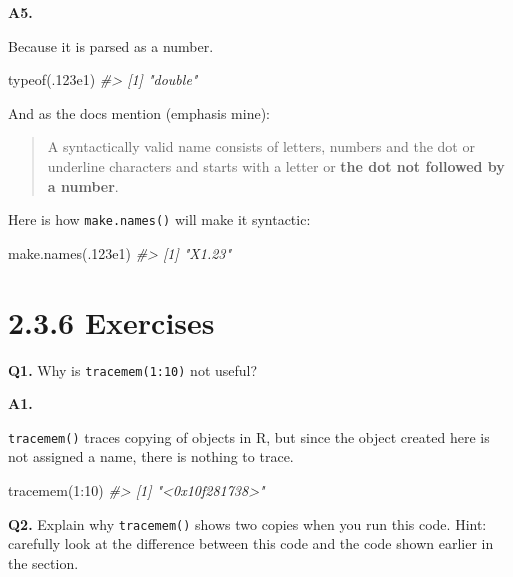 \documentclass[
]{book}
\newenvironment{Shaded}{\begin{snugshade}}{\end{snugshade}}
\newcommand{\CommentTok}[1]{\textcolor[rgb]{0.56,0.35,0.01}{\textit{#1}}}
\newcommand{\DecValTok}[1]{\textcolor[rgb]{0.00,0.00,0.81}{#1}}
\newcommand{\FloatTok}[1]{\textcolor[rgb]{0.00,0.00,0.81}{#1}}
\newcommand{\FunctionTok}[1]{\textcolor[rgb]{0.00,0.00,0.00}{#1}}
\newcommand{\NormalTok}[1]{#1}
\newcommand{\SpecialCharTok}[1]{\textcolor[rgb]{0.00,0.00,0.00}{#1}}
\begin{document}
\textbf{A5.}

Because it is parsed as a number.

\begin{Shaded}
\begin{Highlighting}[]
\FunctionTok{typeof}\NormalTok{(.}\FloatTok{123e1}\NormalTok{)}
\CommentTok{\#\textgreater{} [1] "double"}
\end{Highlighting}
\end{Shaded}

And as the docs mention (emphasis mine):

\begin{quote}
A syntactically valid name consists of letters, numbers and the dot or underline characters and starts with a letter or \textbf{the dot not followed by a number}.
\end{quote}

Here is how \texttt{make.names()} will make it syntactic:

\begin{Shaded}
\begin{Highlighting}[]
\FunctionTok{make.names}\NormalTok{(.}\FloatTok{123e1}\NormalTok{)}
\CommentTok{\#\textgreater{} [1] "X1.23"}
\end{Highlighting}
\end{Shaded}

\hypertarget{exercises-1}{%
\section{2.3.6 Exercises}\label{exercises-1}}

\textbf{Q1.} Why is \texttt{tracemem(1:10)} not useful?

\textbf{A1.}

\texttt{tracemem()} traces copying of objects in R, but since the object created here is not assigned a name, there is nothing to trace.

\begin{Shaded}
\begin{Highlighting}[]
\FunctionTok{tracemem}\NormalTok{(}\DecValTok{1}\SpecialCharTok{:}\DecValTok{10}\NormalTok{)}
\CommentTok{\#\textgreater{} [1] "\textless{}0x10f281738\textgreater{}"}
\end{Highlighting}
\end{Shaded}

\textbf{Q2.} Explain why \texttt{tracemem()} shows two copies when you run this code. Hint: carefully look at the difference between this code and the code shown earlier in the section.
\end{document}
